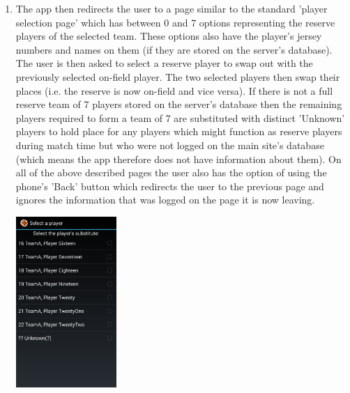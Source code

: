 \documentclass[hidelinks,a4paper,12pt]{article}
\begin{document}
\begin{enumerate}
\begin{center}
			\end{center}
			\item The app then redirects the user to a page similar to the standard 'player selection page' which has between 0 and 7 options representing the reserve players of the selected team. These options also have the player's jersey numbers and names on them (if they are stored on the server's database). The user is then asked to select a reserve player to swap out with the previously selected on-field player. The two selected players then swap their places (i.e. the reserve is now on-field and vice versa). If there is not a full reserve team of 7 players stored on the server's database then the remaining players required to form a team of 7 are substituted with distinct 'Unknown' players to hold place for any players which might function as reserve players during match time but who were not logged on the main site's database (which means the app therefore does not have information about them).
	On all of the above described pages the user also has the option of using the phone's  'Back' button which redirects the user to the previous page and ignores the information that was logged on the page it is now leaving.
		\begin{center}
  				 \includegraphics[width=0.3\textwidth] {./images/choose_substitute_off_field.png}\\[0.4cm]
			\end{center}
		\end{enumerate}
\end{document}
